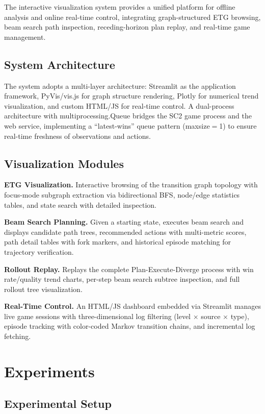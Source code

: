 \documentclass[letterpaper]{article}
\begin{document}
The interactive visualization system provides a unified platform for offline analysis and online real-time control, integrating graph-structured ETG browsing, beam search path inspection, receding-horizon plan replay, and real-time game management.

\subsection{System Architecture}

The system adopts a multi-layer architecture: Streamlit as the application framework, PyVis/vis.js for graph structure rendering, Plotly for numerical trend visualization, and custom HTML/JS for real-time control. A dual-process architecture with multiprocessing.Queue bridges the SC2 game process and the web service, implementing a ``latest-wins'' queue pattern (maxsize$=$1) to ensure real-time freshness of observations and actions.

\subsection{Visualization Modules}

\textbf{ETG Visualization.} Interactive browsing of the transition graph topology with focus-mode subgraph extraction via bidirectional BFS, node/edge statistics tables, and state search with detailed inspection.

\textbf{Beam Search Planning.} Given a starting state, executes beam search and displays candidate path trees, recommended actions with multi-metric scores, path detail tables with fork markers, and historical episode matching for trajectory verification.

\textbf{Rollout Replay.} Replays the complete Plan-Execute-Diverge process with win rate/quality trend charts, per-step beam search subtree inspection, and full rollout tree visualization.

\textbf{Real-Time Control.} An HTML/JS dashboard embedded via Streamlit manages live game sessions with three-dimensional log filtering (level $\times$ source $\times$ type), episode tracking with color-coded Markov transition chains, and incremental log fetching.


\section{Experiments}
\label{sec:experiments}

\subsection{Experimental Setup}
\end{document}

